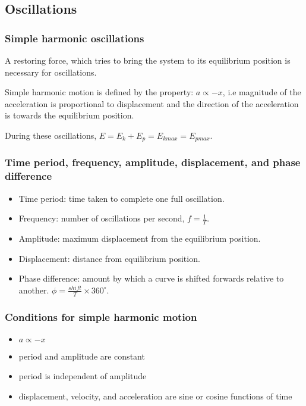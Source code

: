 \subsection{Oscillations}

\subsubsection{Simple harmonic oscillations}
A restoring force, which tries to bring the system to its equilibrium position
is necessary for oscillations.

Simple harmonic motion is defined by the property: $a \propto -x$, i.e
magnitude of the acceleration is proportional to displacement and the direction
of the acceleration is towards the equilibrium position.

During these oscillations, $E = E_k + E_p = E_{kmax} = E_{pmax}$.

\subsubsection{Time period, frequency, amplitude, displacement, and phase
difference}
\begin{itemize}
    \item Time period: time taken to complete one full oscillation.
    \item Frequency: number of oscillations per second, $f = \frac{1}{T}$.
    \item Amplitude: maximum displacement from the equilibrium position.
    \item Displacement: distance from equilibrium position.
    \item Phase difference: amount by which a curve is shifted forwards
        relative to another. $\phi = \frac{shift}{T} \times 360^{\circ}$.
\end{itemize}

\subsubsection{Conditions for simple harmonic motion}
\begin{itemize}
    \item $a \propto -x$
    \item period and amplitude are constant
    \item period is independent of amplitude
    \item displacement, velocity, and acceleration are sine or cosine functions
        of time
\end{itemize}

